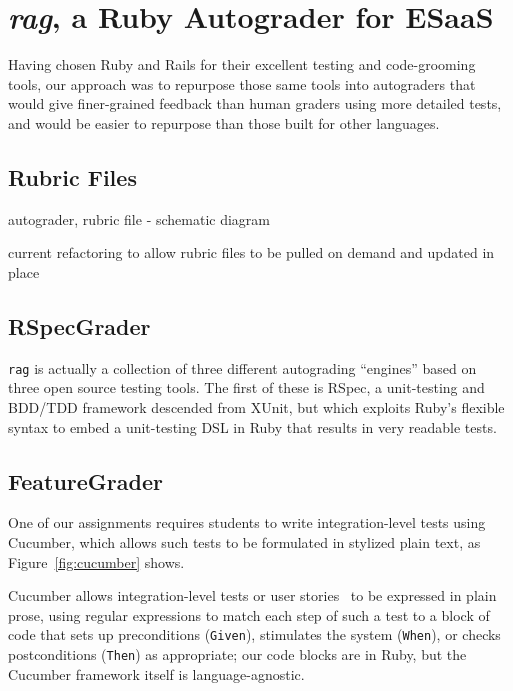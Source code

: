 \section{\emph{rag}, a Ruby Autograder for ESaaS}


Having chosen Ruby and Rails for their excellent testing and
code-grooming tools, our approach was to repurpose those same tools into
autograders that would give finer-grained feedback than human graders
using more detailed tests, and would be easier to repurpose than
those built for other languages.

\subsection{Rubric Files}

autograder, rubric file - schematic diagram

current refactoring to allow rubric files to be pulled on demand and
updated in place

\subsection{RSpecGrader}

\texttt{rag} 
is actually a collection of three different autograding
``engines'' based on three open source testing
tools.  The first of these is
RSpec, a unit-testing and
BDD/TDD framework descended from XUnit, but which exploits Ruby's
flexible syntax to embed a unit-testing DSL in Ruby that results in very
readable tests.  



\subsection{FeatureGrader}

One of our assignments requires students to write integration-level
tests using Cucumber, which allows such tests to be formulated in
stylized plain text, as Figure~\ref{fig:cucumber} shows.

 Cucumber allows
integration-level tests or user stories~\cite{user-stories} to be
expressed in plain prose, using regular expressions to match each step
of such a test to a block of code that sets up preconditions (\texttt{Given}), stimulates
the system (\texttt{When}), or checks postconditions (\texttt{Then}) as
appropriate; our code blocks are in Ruby, but the Cucumber framework
itself is language-agnostic.  


